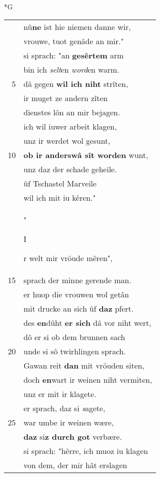 \documentclass[8pt,a4paper,notitlepage]{article}
\begin{document}
\newpage
\begin{table}[ht]
\begin{minipage}[t]{0.5\linewidth}
\small
\begin{center}*G
\end{center}
\begin{tabular}{rl}
 & nû\textbf{ne} ist hie niemen danne wir,\\ 
 & vrouwe, tuot genâde an mir."\\ 
 & si sprach: "an \textbf{gesêrtem} arm\\ 
 & bin ich \textit{selt}en \textit{word}en warm.\\ 
5 & dâ gegen \textbf{wil ich niht} strîten,\\ 
 & ir muget ze andern zîten\\ 
 & dienstes lôn an mir bejagen.\\ 
 & ich wil iuwer arbeit klagen,\\ 
 & unz ir werdet wol gesunt,\\ 
10 & \textbf{ob ir anderswâ sît worden} wunt,\\ 
 & unz daz der schade geheile.\\ 
 & ûf Tschastel Marveile\\ 
 & wil ich mit iu kêren."\\ 
 & "\begin{large}I\end{large}r welt mir vröude mêren",\\ 
15 & sprach der minne gerende man.\\ 
 & er huop die vrouwen wol getân\\ 
 & mit drucke an sich ûf \textbf{daz} pfert.\\ 
 & des \textbf{en}dûht \textbf{er sich} dâ vor niht wert,\\ 
 & dô er si ob dem brunnen sach\\ 
20 & unde si sô twirhlingen sprach.\\ 
 & Gawan reit \textbf{dan} mit vröuden siten,\\ 
 & doch \textbf{en}wart ir weinen niht vermiten,\\ 
 & unz er mit ir klagete.\\ 
 & er sprach, daz si \textit{s}agete,\\ 
25 & war umbe ir weinen wære,\\ 
 & \textbf{daz} si\textbf{z durch got} verbære.\\ 
 & si sprach: "hêrre, ich muoz iu klagen\\ 
 & von dem, der mir hât erslagen\\ 

\end{tabular}
\end{minipage}
\end{table}
\end{document}
